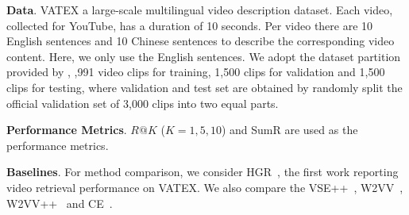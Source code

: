 \begin{table} [tb!]
\renewcommand{\arraystretch}{1.2}
\caption{\textbf{State-of-the-art on VATEX}. Our proposed model performs the best.}
\label{tab:vatex_perf}
\centering 
{}\end{table}


\textbf{Data}. 
VATEX \cite{wang2019vatex} a large-scale multilingual video description dataset. Each video, collected for YouTube, has a duration of 10 seconds. Per video there are 10 English sentences and 10 Chinese sentences to describe the corresponding video content. Here, we only use the English sentences. 
We adopt the dataset partition provided by \cite{chen2020fine}, ,991 video clips for training, 1,500 clips for validation and 1,500 clips for testing, where validation and test set are obtained by randomly split the official validation set of 3,000 clips into two equal parts.


\textbf{Performance Metrics}. 
$R@K$ ($K = 1, 5, 10$) and SumR are used as the performance metrics.

\textbf{Baselines}. For method comparison, we consider HGR~\cite{chen2020fine}, the first work reporting video retrieval performance on VATEX. We also compare the VSE++~\cite{faghri2017vse}, W2VV~\cite{dong2018predicting}, W2VV++~\cite{li2019w2vv++} and CE~\cite{liu2019use}.

